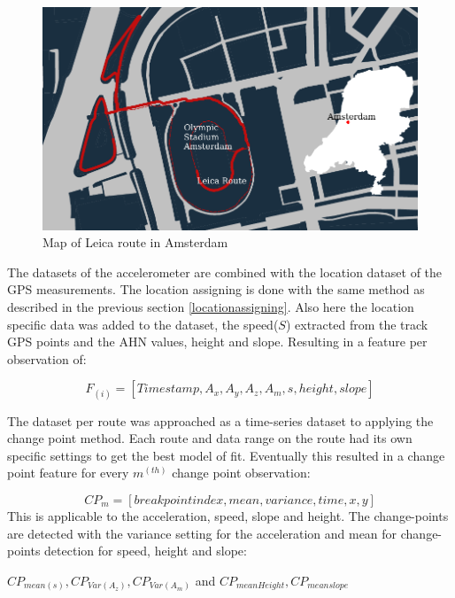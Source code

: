\begin{figure}[hb]
\includegraphics[width=\textwidth]{img/M_overviewRouteLeica.pdf}
\centering
\caption{ Map of Leica route in Amsterdam\label{leicatracks}}
\end{figure}

The datasets of the accelerometer are combined with the location dataset of the GPS measurements. The location assigning is done with the same method as described in the previous section \ref{locationassigning}. Also here the location specific data was added to the dataset, the speed($S$) extracted from the track GPS points and the AHN values, height and slope. Resulting in a feature per observation of:

\begin{equation} 
	F_(i) = [ Time stamp, A_{x}, A_{y}, A_{z}, A_{m}, s, height, slope] 
\end{equation}

The dataset per route was approached as a time-series dataset to applying the change point method. Each route and data range on the route had its own specific settings to get the best model of fit. Eventually this resulted in a change point feature for every $m^(th)$ change point observation:

\begin{equation}
CP_m = [ breakpoint index, mean, variance, time, x,y]
\end{equation}
This is applicable to the acceleration, speed, slope and height. The change-points are detected with the variance setting for the acceleration and mean for change-points detection for speed, height and slope: 

$CP_{mean(s)}, CP_{Var(A_{z})}, CP_{Var(A_{m})}$ and $CP_{mean Height}, CP_{mean slope}$ 

